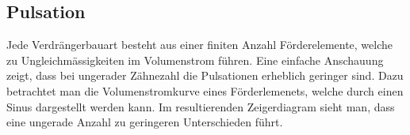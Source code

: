 \subsection{Pulsation}
Jede Verdrängerbauart besteht aus einer finiten Anzahl Förderelemente, welche zu Ungleichmässigkeiten im Volumenstrom führen. Eine einfache Anschauung zeigt, dass bei ungerader Zähnezahl die Pulsationen erheblich geringer sind. Dazu betrachtet man die Volumenstromkurve eines Förderlemenets, welche durch einen Sinus dargestellt werden kann. Im resultierenden Zeigerdiagram sieht man, dass eine ungerade Anzahl zu geringeren Unterschieden führt. 


\vfill
\columnbreak
